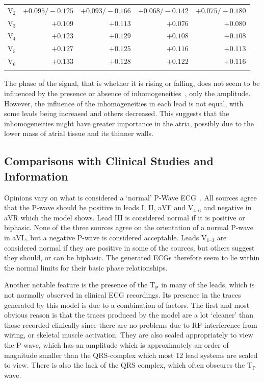 \begin{table}
\begin{tabular}{ l r r r r }
    $\text{V}_{\text{2}}$   & $+0.095/-0.125$ & $+0.093/-0.166$ & $+0.068/-0.142$ & $+0.075/-0.180$ \\
    $\text{V}_{\text{3}}$   & $+0.109$ & $+0.113$ & $+0.076$ & $+0.080$ \\
    $\text{V}_{\text{4}}$   & $+0.123$ & $+0.129$ & $+0.108$ & $+0.108$ \\
    $\text{V}_{\text{5}}$   & $+0.127$ & $+0.125$ & $+0.116$ & $+0.113$ \\
    $\text{V}_{\text{6}}$   & $+0.133$ & $+0.128$ & $+0.122$ & $+0.116$ \\
    \bottomrule
    \label{tbl:bsp:ecg}
    \end{tabular}
\end{table}

The phase of the signal, that is whether it is rising or falling, does not seem
to be influenced by the presence or absence of
inhomogeneities~\cite{Rudy2006,Gulrajani1983}, only the amplitude.
However, the influence of the inhomogeneities in each lead is not equal, with
some leads being increased and others decreased.
This suggests that the inhomogeneities might have greater importance in the
atria, possibly due to the lower mass of atrial tissue and its thinner walls.

\subsection{Comparisons with Clinical Studies and Information}

Opinions vary on what is considered a `normal'
P-Wave ECG~\cite{Lipman1994,Conover1996,Hampton1997}.
All sources agree that the P-wave should be positive in leads I, II, aVF and
$\text{V}_{\text{4--6}}$ and negative in aVR which the model shows.
Lead III is considered normal if it is positive or biphasic.
None of the three sources agree on the orientation of a normal P-wave in aVL,
but a negative P-wave is considered acceptable.
Leads $\text{V}_{\text{1--3}}$ are considered normal if they are positive in
some of the sources, but others suggest they should, or can be biphasic.
The generated ECGs therefore seem to lie within the normal limits for their
basic phase relationships.

Another notable feature is the presence of the $\text{T}_{\text{P}}$ in many of
the leads, which is not normally observed in clinical ECG recordings.
Its presence in the traces generated by this model is due to a combination of
factors.
The first and most obvious reason is that the traces produced by the model are a
lot `cleaner' than those recorded clinically since there are no problems due to
RF interference from wiring, or skeletal muscle activation.
They are also scaled appropriately to view the P-wave, which has an
amplitude which is approximately an order of magnitude smaller than the
QRS-complex which most 12 lead systems are scaled to view.
There is also the lack of the QRS complex, which often obscures the
$\text{T}_{\text{P}}$ wave.

